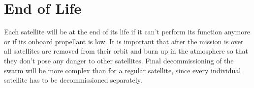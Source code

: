 \section{End of Life}
\label{blSSEOL}

Each satellite will be at the end of its life if it can't perform its function anymore or if its onboard propellant is low.
It is important that after the mission is over all satellites are removed from their orbit and burn up in the atmosphere so that they don't pose any danger to other satellites.
Final decommissioning of the swarm will be more complex than for a regular satellite, since every individual satellite has to be decommissioned separately.